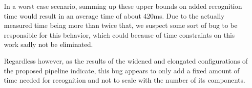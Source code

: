 In a worst case scenario, summing up these upper bounds on added recognition time would result in an average time of about 420ms.  
Due to the actually measured time being more than twice that, we suspect some sort of bug to be responsible for this behavior, which could because of time constraints on this work sadly not be eliminated.

Regardless however, as the results of the widened and elongated configurations of the proposed pipeline indicate, this bug appears to only add a fixed amount of time needed for recognition and not to scale with the number of its components. 






